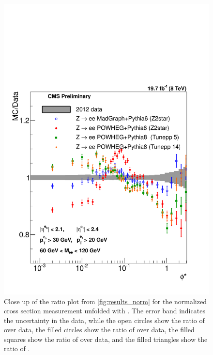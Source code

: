 \begin{figure}[!p]
    \centering
    \includegraphics[width=\textwidth]{figures/ZShape_Ratioelec_PH_Norm_Dressed.pdf}
    \caption[
        Close up of the ratio plot from \cref{fig:results_norm} for the
        normalized cross section measurement unfolded with \PPsixZtwo.
    ]{
        Close up of the ratio plot from \cref{fig:results_norm} for the
        normalized cross section measurement unfolded with \PPsixZtwo. The
        error band indicates the uncertainty in the data, while the open
        circles show the ratio of \MADGRAPH over data, the filled circles show
        the ratio of \PPsixZtwo over data, the filled squares show the ratio of
        \PPeightTTfive over data, and the filled triangles show the ratio of
        \PPeightTTfourteen.
    }
    \label{fig:results_ratio_norm_powheg}
\end{figure}
